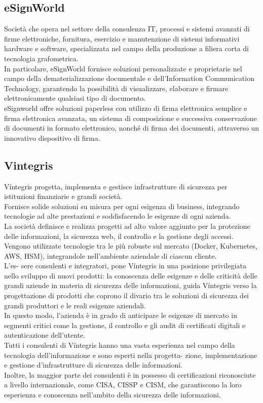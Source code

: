 \subsection{eSignWorld}
Società che opera nel settore della consulenza IT, processi e sistemi avanzati di firme elettroniche,
fornitura, esercizio e manutenzione di sistemi informativi hardware e software, specializzata nel
campo della produzione a filiera corta di tecnologia grafometrica.\\ In particolare, eSignWorld
fornisce soluzioni personalizzate e proprietarie nel campo della dematerializzazione documentale
e dell'Information Communication Technology, garantendo la possibilità di visualizzare,
elaborare e firmare elettronicamente qualsiasi tipo di documento.\\ eSignworld offre soluzioni
paperless con utilizzo di firma elettronica semplice e firma elettronica avanzata, un sistema di
composizione e successiva conservazione di documenti in formato elettronico, nonché di firma dei
documenti, attraverso un innovativo dispositivo di firma.
\subsection{Vintegris}
Víntegris progetta, implementa e gestisce infrastrutture di sicurezza per istituzioni finanziarie
e grandi società.\\ Fornisce solide soluzioni su misura per ogni esigenza di business, integrando
tecnologie ad alte prestazioni e soddisfacendo le esigenze di ogni azienda.\\ La società definisce e
realizza progetti ad alto valore aggiunto per la protezione delle informazioni, la sicurezza web, il
controllo e la gestione degli accessi.\\ Vengono utilizzate tecnologie tra le più robuste sul mercato
(Docker, Kubernetes, AWS, HSM), integrandole nell'ambiente aziendale di ciascun cliente.\\ L'es-
sere consulenti e integratori, pone Víntegris in una posizione privilegiata nello sviluppo di nuovi
prodotti: la conoscenza delle esigenze e delle criticità delle grandi aziende in materia di sicurezza
delle informazioni, guida Víntegris verso la progettazione di prodotti che coprono il divario tra le
soluzioni di sicurezza dei grandi produttori e le reali esigenze aziendali.\\ In questo modo, l'azienda
è in grado di anticipare le esigenze di mercato in segmenti critici come la gestione, il controllo e
gli audit di certificati digitali e autenticazione dell'utente.\\ Tutti i consulenti di Víntegris hanno
una vasta esperienza nel campo della tecnologia dell'informazione e sono esperti nella progetta-
zione, implementazione e gestione d'infrastrutture di sicurezza delle informazioni.\\ Inoltre, la
maggior parte dei consulenti è in possesso di certificazioni riconosciute a livello internazionale,
come CISA, CISSP e CISM, che garantiscono la loro esperienza e conoscenza nell'ambito della
sicurezza delle informazioni.

